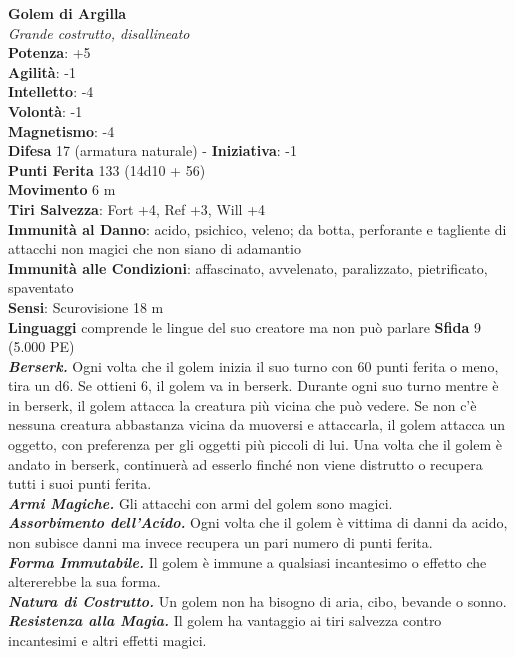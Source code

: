 \begin{multicols}{2}
\medskip\textbf{Golem di Argilla}\\
\emph{Grande costrutto, disallineato}\\
\textbf{Potenza}: +5\\
\textbf{Agilità}: -1\\
\textbf{Intelletto}: -4\\
\textbf{Volontà}: -1\\
\textbf{Magnetismo}: -4\\
\textbf{Difesa} 17 (armatura naturale) - \textbf{Iniziativa}: -1\\
\textbf{Punti Ferita} 133 (14d10 + 56)\\
\textbf{Movimento} 6 m\\
\textbf{Tiri Salvezza}: Fort +4, Ref +3, Will +4\\
\textbf{Immunità al Danno}: acido, psichico, veleno; da botta, perforante e tagliente di attacchi non magici che non siano di adamantio\\
\textbf{Immunità alle Condizioni}: affascinato, avvelenato, paralizzato, pietrificato, spaventato\\
\textbf{Sensi}: Scurovisione 18 m\\
\textbf{Linguaggi} comprende le lingue del suo creatore ma non può parlare
\textbf{Sfida} 9 (5.000 PE)\smallskip\\
\emph{\textbf{Berserk.}} Ogni volta che il golem inizia il suo turno con 60 punti ferita o meno, tira un d6. Se ottieni 6, il golem va in berserk. Durante ogni suo turno mentre è in berserk, il golem attacca la creatura più vicina che può vedere. Se non c'è nessuna creatura abbastanza vicina da muoversi e attaccarla, il golem attacca un oggetto, con preferenza per gli oggetti più piccoli di lui. Una volta che il golem è andato in berserk, continuerà ad esserlo finché non viene distrutto o recupera tutti i suoi punti ferita.\\
\emph{\textbf{Armi Magiche.}} Gli attacchi con armi del golem sono magici.\\
\emph{\textbf{Assorbimento dell'Acido.}} Ogni volta che il golem è vittima di danni da acido, non subisce danni ma invece recupera un pari numero di punti ferita.\\
\emph{\textbf{Forma Immutabile.}} Il golem è immune a qualsiasi incantesimo o effetto che altererebbe la sua forma. \\
\emph{\textbf{Natura di Costrutto.}} Un golem non ha bisogno di aria, cibo, bevande o sonno.\\
\emph{\textbf{Resistenza alla Magia.}} Il golem ha vantaggio ai tiri salvezza contro incantesimi e altri effetti magici.\\

\end{multicols}
